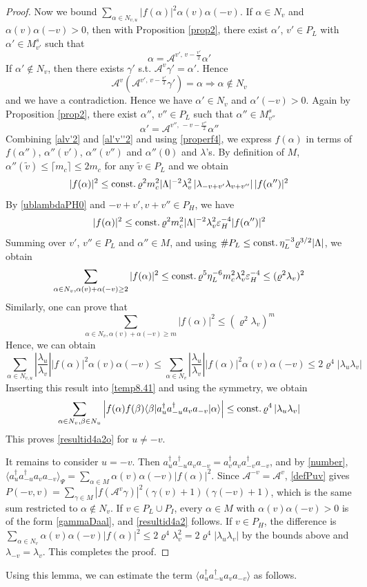 \documentclass[11pt]{article}
\numberwithin{equation}{section}
\newcommand{\beq}{\begin{equation}}
\newcommand{\eeq}{\end{equation}}
\newcommand\eps{\varepsilon}
\newcommand\const{{\rm const.\, }}
\newcommand\al{{\alpha}}
\newcommand\be{\beta}
\renewcommand\rho\varrho
\theoremstyle{definition}
\begin{document}
\begin{proof}
Now we bound $\sum_{\al \in N_{v,u}}|f(\al)|^2\al(v)\al(-v)$. If $\al   \in N_v$ and $\al(v)\al(-v)>0$, then with Proposition  \ref{prop2}, there exist $\al'$, $v'\in P_L$ with  $\al'\in M_{v'}^s$ such that 
\beq\label{alv'2}
\al=\mathcal A^{v', \,v-\frac{v'}{2}}\al'
\eeq
If $\al'\notin N_v$, then there exists $\gamma'$ s.t. $\mathcal A^{v}\gamma'=\al'$. Hence 
$$\mathcal A^v(\mathcal A^{v', \,v-\frac{v'}{2}}\gamma')=\al\Rightarrow\al\notin N_v
$$
and we have a contradiction. 
Hence  we have $\al'\in N_v$ and $\al'(-v)>0$. Again by  Proposition  \ref{prop2}, there exist $\al''$, $v''\in P_L$ such that  $\al''\in M_{v''}^s$ 
\beq\label{al'v''2}
\al'=\mathcal A^{v'', \,-v-\frac{v''}{2}}\al''
\eeq
Combining \eqref{alv'2} and \eqref{al'v''2} and using \eqref{properf4}, we  express $f(\al)$ in terms of  $f(\al'')$, $\al''(v')$, $\al''(v'')$ and $\al''(0)$ and $\lambda$'s. By definition of $M$,
 $\al''(\widetilde v)\leq \lceil m_c\rceil\leq 2m_c$  for any $\widetilde v\in P_L$ and  we obtain %
\beq\label{temp8.44}
|f(\al)|^2\leq \const \rho^2 m_c^2|\Lambda|^{-2}\lambda_v^2\left|\lambda_{-v+v'}\lambda_{v+v''}\right||f(\al'')|^2
\eeq
By \eqref{ublambdaPH0} and $-v+v',v+v''\in P_H$, we have
\beq
|f(\al)|^2\leq  \const \rho^2m_c^2|\Lambda|^{-2}\lambda_v^2 \eps_H^{-4}|f(\al'')|^2
\eeq
Summing  over $v'$, $v''\in P_L$ and $\al''\in M$, and using $\#P_L\leq\const\eta_L^{-3}\rho^{3/2}|\Lambda|$, we obtain
\beq
\sum_{\al \in N_v, \al(v)+\al(-v)\geq2}|f(\al)|^2\leq \const \rho^5\eta_L^{-6} m_c^2\lambda_v^2 \eps_H^{-4}\leq (\rho^2\lambda_v)^2
\eeq 
Similarly, one can prove that  
\beq
\sum_{\al\in N_v, \al(v)+\al(-v)\geq m}|f(\al)|^2\leq  (\rho^2\lambda_v)^m
\eeq
Hence, we can obtain
\beq\nonumber
\sum_{\al\in N_{v,u} }\left|\frac{\lambda_u}{\lambda_v} \right||f(\al)|^2\al(v)\al(-v)\leq\sum_{\al\in N_v }\left|\frac{\lambda_u}{\lambda_v} \right||f(\al)|^2\al(v)\al(-v)\leq 2\rho^4\left|\lambda_u\lambda_v \right|
\eeq
Inserting this result into \eqref{temp8.41} and using the symmetry, we obtain
\beq
\sum_{\al\in N_v,\be\in N_u}\left|f(\al)f(\be)\langle \be|a_u^\dagger a_{-u}^\dagger a_v  a_{-v}|\al\rangle\right|\leq \const \rho^4\left|\lambda_u\lambda_v\right|
\eeq
This proves \eqref{resultid4a2o} for $u\neq -v$.

It remains to consider $u=-v$. Then $a_u^\dagger a_{-u}^\dagger a_v  a_{-v}=a_v^\dagger a_v a_{-v}^\dagger a_{-v}$, and by \eqref{number}, $\langle a_u^\dagger a_{-u}^\dagger a_v  a_{-v}\rangle_\Psi=\sum_{\al\in M}\al(v)\al(-v)|f(\al)|^2$. Since $\mathcal A^{-v}=\mathcal A^{v}$, \eqref{defPuv} gives $P(-v,v)=\sum_{\gamma\in M}|f(\mathcal A^v\gamma)|^2(\gamma(v)+1)(\gamma(-v)+1)$, which is the same sum restricted to $\al\notin N_v$. If $v\in P_L\cup P_I$, every $\al\in M$ with $\al(v)\al(-v)>0$ is of the form \eqref{gammaDaal}, and \eqref{resultid4a2} follows. If $v\in P_H$, the difference is $\sum_{\al\in N_v}\al(v)\al(-v)|f(\al)|^2\leq 2\rho^4\lambda_v^2=2\rho^4|\lambda_u\lambda_v|$ by the bounds above and $\lambda_{-v}=\lambda_v$. This completes the proof.
\end{proof}
Using this lemma, we can estimate the term $\langle a^\dagger_ua^\dagger_{-u}a_va_{-v}\rangle$ as follows.
\end{document}
